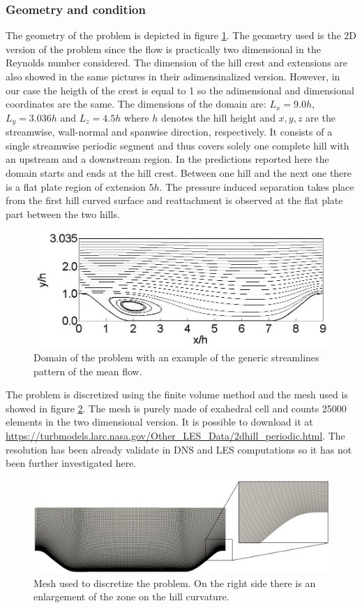 \subsubsection{Geometry and condition}
The geometry of the problem is depicted in figure \ref{fig:dom}. The geometry used is the 2D version of the problem since the flow is practically two dimensional in the Reynolds number considered. The dimension of the hill crest and extensions are also showed in the same pictures in their adimensinalized version. However, in our case the heigth of the crest is equal to 1 so the adimensional and dimensional coordinates are the same. The dimensions of the domain are: $L_x = 9.0 h$, $L_y = 3.036 h$ and $L_z = 4.5 h$ where $h$ denotes the hill height and $x,y,z$ are the streamwise, wall-normal and spanwise direction, respectively. It consists of a single streamwise periodic segment and thus covers solely one complete hill with an upstream and a downstream region. In the predictions reported here the domain starts and ends at the hill crest. 
Between one hill and the next one there is a flat plate region of extension $5h$. The pressure induced separation takes place from the first hill curved surface and reattachment is observed at the flat plate part between the two hills.

\begin{figure}[h]
	\centering
	\includegraphics[width=0.7\linewidth]{chapter_5/figure/domain}
	\caption{Domain of the problem with an example of the generic streamlines pattern of the mean flow.}
	\label{fig:dom}
\end{figure}

The problem is discretized using the finite volume method and the mesh used is showed in figure \ref{fig:mesh_hill}. The mesh is purely made of exahedral cell and counts 25000 elements in the two dimensional version. It is possible to download it at \url{https://turbmodels.larc.nasa.gov/Other_LES_Data/2dhill_periodic.html}. The resolution has been already validate in DNS and LES computations so it has not been further investigated here.

\begin{figure}[h]
	\centering
	\includegraphics[width=1\linewidth]{chapter_5/figure/mesh}
	\caption{Mesh used to discretize the problem. On the right side there is an enlargement of the zone on the hill curvature.}
	\label{fig:mesh_hill}
\end{figure}


